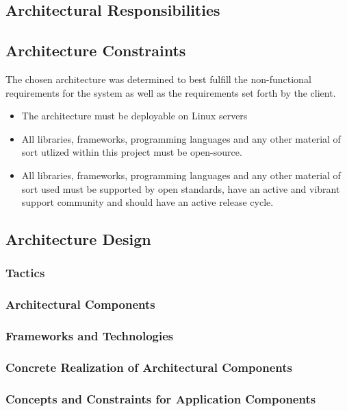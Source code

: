 \subsection{Architectural Responsibilities}

\subsection{Architecture Constraints}

\label{sec:systemArchitecturalConstraints}
The chosen architecture was determined to best fulfill the non-functional
requirements for the system as well as the requirements set forth by the
client.
\begin{itemize}
	\item The architecture must be deployable on Linux servers
	\item All libraries, frameworks, programming languages and any other
	material of sort utlized within this project must be open-source.
	\item All libraries, frameworks, programming languages and any other
	material of sort used must be supported by open standards, have an 
	active and vibrant support community and should have an active 
	release cycle. 	
\end{itemize}

\subsection{Architecture Design}
\subsubsection{Tactics}
\subsubsection{Architectural Components}
\subsubsection{Frameworks and Technologies}
\subsubsection{Concrete Realization of Architectural Components}
\subsubsection{Concepts and Constraints for Application Components}
